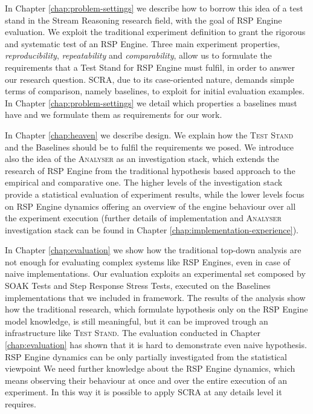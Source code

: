 In Chapter \ref{chap:problem-settings} we describe how to borrow this idea of a test stand in the Stream Reasoning research field, with the goal of RSP Engine evaluation. We exploit the traditional experiment definition to grant the rigorous and systematic test of an RSP Engine. Three main experiment properties, \textit{reproducibility}, \textit{repeatability} and \textit{comparability}, allow us to formulate the requirements that a Test Stand for RSP Engine must fulfil, in order to answer our research question. SCRA, due to its case-oriented nature, demands simple terms of comparison, namely baselines, to exploit for initial evaluation examples. In Chapter \ref{chap:problem-settings} we detail which properties a baselines must have and we formulate them as  requirements for our work.

In Chapter \ref{chap:heaven} we describe \name design. We explain how the \textsc{Test Stand} and the Baselines should be to fulfil the requirements we posed. We introduce also the idea of the \textsc{Analyser} as an investigation stack, which extends the research of RSP Engine from the traditional hypothesis based approach to the empirical and comparative one. The higher levels of the investigation stack provide a statistical evaluation of experiment results, while the lower levels focus on RSP Engine dynamics offering an overview of the engine behaviour over all the experiment execution (further details of \name implementation and \textsc{Analyser} investigation stack can be found in Chapter \ref{chap:implementation-experience}).

In Chapter \ref{chap:evaluation} we show how the traditional top-down analysis are not enough for evaluating complex systems like RSP Engines, even in case of naive implementations. Our evaluation exploits an experimental set composed by SOAK Tests and Step Response Stress Tests, executed on the Baselines implementations that we included in \name framework. The results of the analysis show how the traditional research, which formulate hypothesis only on the RSP Engine model knowledge, is still meaningful, but it can be improved trough an infrastructure like \name \textsc{Test Stand}. The evaluation conducted in Chapter \ref{chap:evaluation} has shown that it is hard to demonstrate even naive hypothesis. RSP Engine dynamics can be only partially investigated from the statistical viewpoint We need further knowledge about the RSP Engine dynamics, which means observing their behaviour at once and over the entire execution of an experiment. In this way it is possible to apply SCRA at any details level it requires.\\

